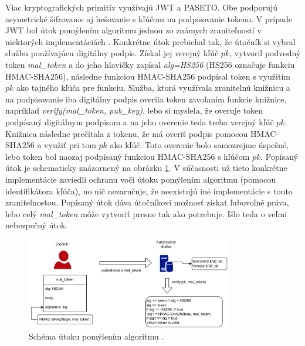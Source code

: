 Viac kryptografických primitív využívajú JWT a PASETO. Obe podporujú asymetrické šifrovanie aj hešovanie s kľúčom na podpisovanie tokenu. V prípade JWT bol útok pomýlením algoritmu jednou zo známych zraniteľností v niektorých implementáciách \cite{jwt_vul}. Konkrétne útok prebiehal tak, že útočník si vybral službu používajúcu digitálny podpis. Získal jej verejný kľúč $pk$, vytvoril podvodný token \textit{mal\_token} a do jeho hlavičky zapísal \textit{alg=HS256} (HS256 označuje funkciu HMAC-SHA256), následne funkciou HMAC-SHA256 podpísal token s využitím $pk$ ako tajného kľúča pre funkciu. Služba, ktorá využívala zraniteľnú knižnicu a na podpisovanie iba digitálny podpis overila token zavolaním funkcie knižnice, napríklad \textit{verify(mal\_token, pub\_key)}, lebo si myslela, že overuje token podpísaný digitálnym podpisom a na jeho overenie teda treba verejný kľúč $pk$. Knižnica následne prečítala z tokenu, že má overiť podpis pomocou HMAC-SHA256 a využiť pri tom $pk$ ako kľúč. Toto overenie bolo samozrejme úspešné, lebo token bol naozaj podpísaný funkciou HMAC-SHA256 s kľúčom $pk$. Popísaný útok je schematicky znázornený na obrázku \ref{fig:conf_alg_attack}. V súčasnosti už tieto konkrétne implementácie zaviedli ochranu voči útoku pomýlením algoritmu (pomocou identifikátora kľúča), no nič nezaručuje, že neexistujú iné implementácie s touto zraniteľnosťou. Popísaný útok dáva útočníkovi možnosť získať ľubovoľné práva, lebo celý \textit{mal\_token} môže vytvoriť presne tak ako potrebuje. Išlo teda o veľmi nebezpečný útok.

\begin{figure}
  \centerline{\includegraphics[width=0.8\textwidth]{images/conf_alg_attack}}
  \caption[Útok pomýlením algortimu]{Schéma útoku pomýlením algoritmu \cite{jwt_vul}.}
  \label{fig:conf_alg_attack}
\end{figure}

